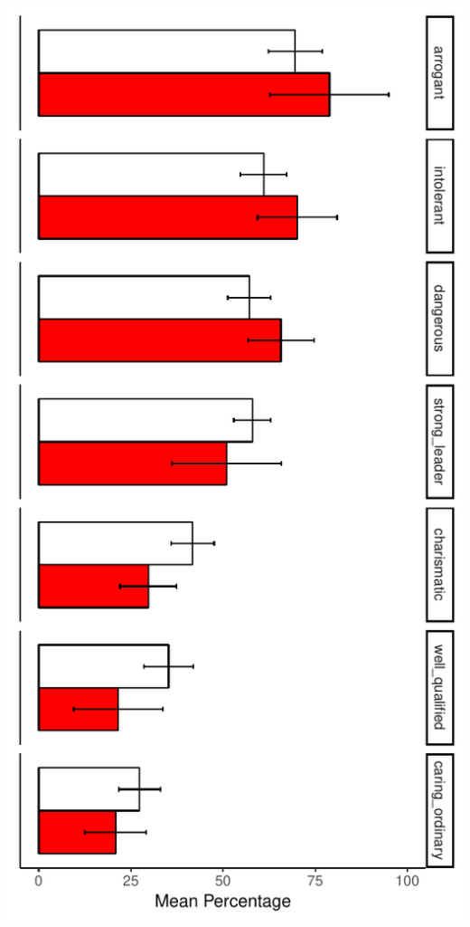 \documentclass{article}\usepackage[]{graphicx}\usepackage[]{color}
\makeatletter
\def\maxwidth{ %
  \ifdim\Gin@nat@width>\linewidth
    \linewidth
  \else
    \Gin@nat@width
  \fi
}
\newenvironment{knitrout}{}{} %
\makeatother
\begin{document}
\begin{knitrout}
\includegraphics[width=\maxwidth]{figure/unnamed-chunk-13-1} 

\end{knitrout}
\end{document}
